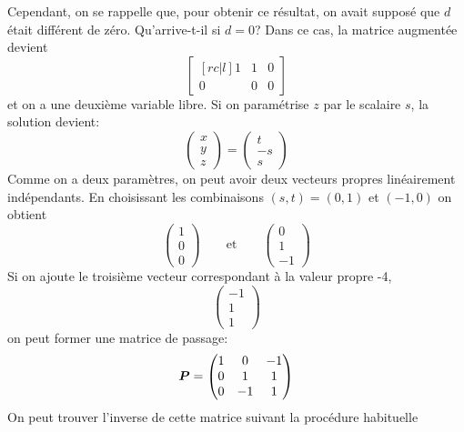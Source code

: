 Cependant, on se rappelle que, pour obtenir ce résultat, on avait supposé que $d$ était
différent de zéro.  Qu'arrive-t-il si $d=0$?  Dans ce cas, la matrice augmentée
devient
\[
\begin{bmatrix}[rc|l]
1 & 1 & 0\\
0 & 0 & 0
\end{bmatrix}
\]
et on a une deuxième variable libre.  Si on paramétrise $z$ par le scalaire $s$, la
solution devient:
\[
\begin{pmatrix}
x \\ y \\ z
\end{pmatrix} = \begin{pmatrix}
t \\ -s \\ s
\end{pmatrix}
\]
Comme on a deux paramètres, on peut avoir deux vecteurs propres linéairement
indépendants.  En choisissant les combinaisons $(s,t) = (0,1)$ et $(-1,0)$ on obtient
\[
\begin{pmatrix}
1 \\ 0 \\ 0
\end{pmatrix}
\qquad\mbox{et}\qquad
\begin{pmatrix}
0 \\ 1 \\ -1
\end{pmatrix}
\]
Si on ajoute le troisième vecteur correspondant à la valeur propre -4,
\[
\begin{pmatrix}
-1\\1\\1
\end{pmatrix}\]
on peut former une matrice de passage:
\[
\boldsymbol{P} = \begin{pmatrix}
1 & 0 & -1 \\
0 & 1 & 1 \\
0 & -1 & 1 
\end{pmatrix}
\]
On peut trouver l'inverse de cette matrice suivant la procédure habituelle
